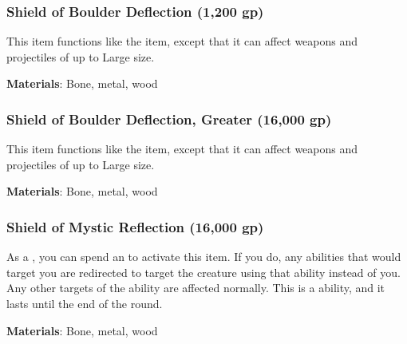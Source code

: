 \lowercase{\hypertarget{item:Shield of Boulder Deflection}{}}\label{item:Shield of Boulder Deflection}
\hypertarget{item:Shield of Boulder Deflection}{\subsubsection{Shield of Boulder Deflection\hfill{} (1,200 gp)}}

This item functions like the  item, except that it can affect weapons and projectiles of up to Large size.



\vspace{0.25em}
\textbf{Materials}: Bone, metal, wood


\lowercase{\hypertarget{item:Shield of Boulder Deflection, Greater}{}}\label{item:Shield of Boulder Deflection, Greater}
\hypertarget{item:Shield of Boulder Deflection, Greater}{\subsubsection{Shield of Boulder Deflection, Greater\hfill{} (16,000 gp)}}

This item functions like the  item, except that it can affect weapons and projectiles of up to Large size.



\vspace{0.25em}
\textbf{Materials}: Bone, metal, wood


\lowercase{\hypertarget{item:Shield of Mystic Reflection}{}}\label{item:Shield of Mystic Reflection}
\hypertarget{item:Shield of Mystic Reflection}{\subsubsection{Shield of Mystic Reflection\hfill{} (16,000 gp)}}

As a , you can spend an  to activate this item.
If you do, any   abilities that would target you are redirected to target the creature using that ability instead of you.
Any other targets of the ability are affected normally.
This is a  ability, and it lasts until the end of the round.



\vspace{0.25em}
\textbf{Materials}: Bone, metal, wood


